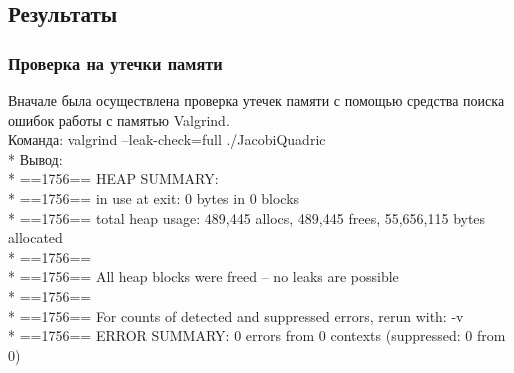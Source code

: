 \documentclass[12pt]{article}
\begin{document}
\subsection{Результаты}
\subsubsection{Проверка на утечки памяти}
Вначале была осуществлена проверка утечек памяти с помощью средства поиска ошибок работы с памятью Valgrind. \\
Команда: valgrind --leak-check=full ./JacobiQuadric\\*
Вывод:\\*
==1756==  HEAP SUMMARY:\\*
==1756==     in use at exit: 0 bytes in 0 blocks\\*
==1756==   total heap usage: 489,445 allocs, 489,445 frees, 55,656,115 bytes allocated\\*
==1756== \\*
==1756== All heap blocks were freed -- no leaks are possible\\*
==1756== \\*
==1756== For counts of detected and suppressed errors, rerun with: -v\\*
==1756== ERROR SUMMARY: 0 errors from 0 contexts (suppressed: 0 from 0)\\
\end{document}
